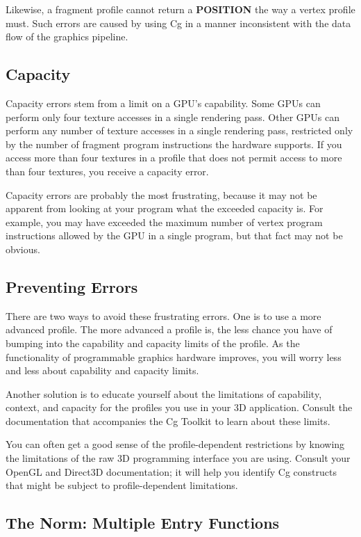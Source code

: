 \documentclass{book}
\begin{document}
Likewise, a fragment profile cannot return a \textbf{POSITION} the way a vertex profile must. Such errors are caused by using Cg in a manner inconsistent with the data flow of the graphics pipeline.

\subsection*{Capacity}

Capacity errors stem from a limit on a GPU's capability. Some GPUs can perform only four texture accesses in a single rendering pass. Other GPUs can perform any number of texture accesses in a single rendering pass, restricted only by the number of fragment program instructions the hardware supports. If you access more than four textures in a profile that does not permit access to more than four textures, you receive a capacity error.

Capacity errors are probably the most frustrating, because it may not be apparent from looking at your program what the exceeded capacity is. For example, you may have exceeded the maximum number of vertex program instructions allowed by the GPU in a single program, but that fact may not be obvious.

\subsection*{Preventing Errors}

There are two ways to avoid these frustrating errors. One is to use a more advanced profile. The more advanced a profile is, the less chance you have of bumping into the capability and capacity limits of the profile. As the functionality of programmable graphics hardware improves, you will worry less and less about capability and capacity limits.

Another solution is to educate yourself about the limitations of capability, context, and capacity for the profiles you use in your 3D application. Consult the documentation that accompanies the Cg Toolkit to learn about these limits.

You can often get a good sense of the profile-dependent restrictions by knowing the limitations of the raw 3D programming interface you are using. Consult your OpenGL and Direct3D documentation; it will help you identify Cg constructs that might be subject to profile-dependent limitations.

\subsection{The Norm: Multiple Entry Functions}
\end{document}
